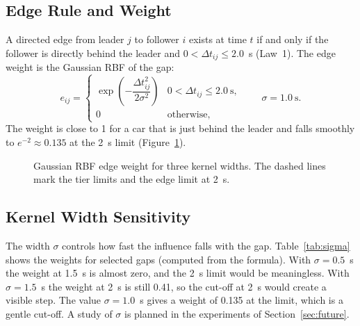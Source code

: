 \documentclass[11pt,a4paper]{article}
\newcommand{\dt}{\Delta t}
\begin{document}
\subsection{Edge Rule and Weight}
A directed edge from leader $j$ to follower $i$ exists at time $t$ if
and only if the follower is directly behind the leader and $0 < \dt_{ij} \le 2.0$~s
(Law~1). The edge weight is the Gaussian RBF of the gap:
\begin{equation}
e_{ij} =
\begin{cases}
\exp\!\left(-\dfrac{\dt_{ij}^{2}}{2\sigma^{2}}\right) & 0 < \dt_{ij} \le 2.0\ \text{s},\\[2mm]
0 & \text{otherwise,}
\end{cases}
\qquad \sigma = 1.0\ \text{s}.
\end{equation}
The weight is close to 1 for a car that is just behind the leader and falls
smoothly to $e^{-2} \approx 0.135$ at the 2~s limit (Figure~\ref{fig:rbf}).

\begin{figure}[H]
\centering
{}
\caption{Gaussian RBF edge weight for three kernel widths. The dashed lines mark the tier limits and the edge limit at 2~s.}
\label{fig:rbf}
\end{figure}

\subsection{Kernel Width Sensitivity}
The width $\sigma$ controls how fast the influence falls with the gap.
Table~\ref{tab:sigma} shows the weights for selected gaps (computed from the
formula). With $\sigma = 0.5$~s the weight at 1.5~s is almost zero, and the
2~s limit would be meaningless. With $\sigma=1.5$~s the weight at 2~s is still
0.41, so the cut-off at 2~s would create a visible step. The value
$\sigma=1.0$~s gives a weight of 0.135 at the limit, which is a gentle cut-off.
A study of $\sigma$ is planned in the experiments of Section~\ref{sec:future}.
\end{document}
